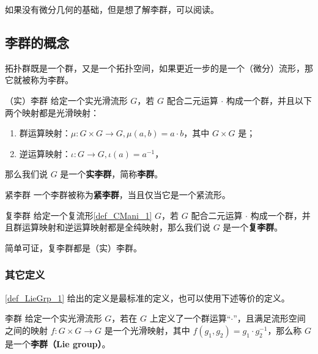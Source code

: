 

如果没有微分几何的基础，但是想了解李群，可以阅读。

\subsection{李群的概念}

拓扑群既是一个群，又是一个拓扑空间，如果更近一步的是一个（微分）流形，那它就被称为李群。
\begin{definition}{（实）李群}\label{def_LieGrp_1}
给定一个实光滑流形 $G$，若 $G$ 配合二元运算 $\cdot$ 构成一个群，并且以下两个映射都是光滑映射：
\begin{enumerate}
\item 群运算映射：$\mu:G\times G\to G, \mu(a,b)=a\cdot b$，其中 $G\times G$ 是；
\item 逆运算映射：$\iota:G\to G, \iota(a)=a^{-1}$，
\end{enumerate}
那么我们说 $G$ 是一个\textbf{实李群}，简称\textbf{李群}。
\end{definition}

\begin{definition}{紧李群}
一个李群被称为\textbf{紧李群}，当且仅当它是一个紧流形。
\end{definition}

\begin{definition}{复李群}\label{def_LieGrp_6}
给定一个复流形\autoref{def_CMani_1}  $G$，若 $G$ 配合二元运算 $\cdot$ 构成一个群，并且群运算映射和逆运算映射都是全纯映射，那么我们说 $G$ 是一个\textbf{复李群}。
\end{definition}
简单可证，复李群都是（实）李群。


\subsubsection{其它定义}

\autoref{def_LieGrp_1} 给出的定义是最标准的定义，也可以使用下述等价的定义。

\begin{definition}{李群}\label{def_LieGrp_3}
给定一个实光滑流形 $G$，若在 $G$ 上定义了一个群运算“$\cdot$”，且满足流形空间之间的映射 $f:G\times G\rightarrow G$ 是一个光滑映射，其中 $f(g_1, g_2)=g_1\cdot g_2^{-1}$，那么称 $G$ 是一个\textbf{李群（Lie group）}。
\end{definition}


